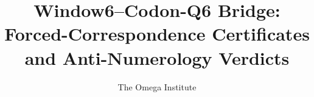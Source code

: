 \documentclass[11pt]{article}
\title{Window6--Codon-Q6 Bridge: Forced-Correspondence Certificates and Anti-Numerology Verdicts}
\author{The Omega Institute}
\date{}
\newcommand{\origin}[1]{}
\newcommand{\closureat}[2]{}
\providecommand{\WindowSix}{\mathrm{Window6}}
\begin{document}
\maketitle

\origin{ai}
\closureat{\WindowSix}{scoped}





\end{document}
